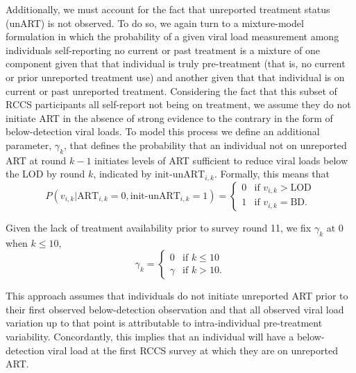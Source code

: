 \documentclass{article}[11pt]
\begin{document}
Additionally, we must account for the fact that unreported treatment status (unART) is not observed. To do so, we again turn to a mixture-model formulation in which the probability of a given viral load measurement among individuals self-reporting no current or past treatment is a mixture of one component given that that individual is truly pre-treatment (that is, no current or prior unreported treatment use) and another given that that individual is on current or past unreported treatment. Considering the fact that this subset of RCCS participants all self-report not being on treatment, we assume they do not initiate ART in the absence of strong evidence to the contrary in the form of below-detection viral loads.
To model this process we define an additional parameter, $\gamma_k$, that defines the probability that an individual not on unreported ART at round $k-1$ initiates levels of ART sufficient to reduce viral loads below the LOD by round $k$, indicated by $\text{init-unART}_{i,k}$.  Formally, this means that
\begin{equation}
P(v_{i,k}|\text{ART}_{i,k}=0, \text{init-unART}_{i,k}=1) = \begin{cases}
    0 &\text{if } v_{i,k} > \text{LOD} \\
    1 &\text{if } v_{i,k} = \text{BD}.
\end{cases}
\end{equation}

Given the lack of treatment availability prior to survey round 11, we fix $\gamma_k$ at 0 when $k \leq 10$,
\begin{equation}
\gamma_k = 
\begin{cases}
0 & \text{if } k \leq 10 \\
\gamma & \text{if } k > 10.
\end{cases}
\end{equation}

This approach assumes that individuals do not initiate unreported ART prior to their first observed below-detection observation and that all observed viral load variation up to that point is attributable to intra-individual pre-treatment variability. Concordantly, this implies that an individual will have a below-detection viral load at the first RCCS survey at which they are on unreported ART.
\end{document}
